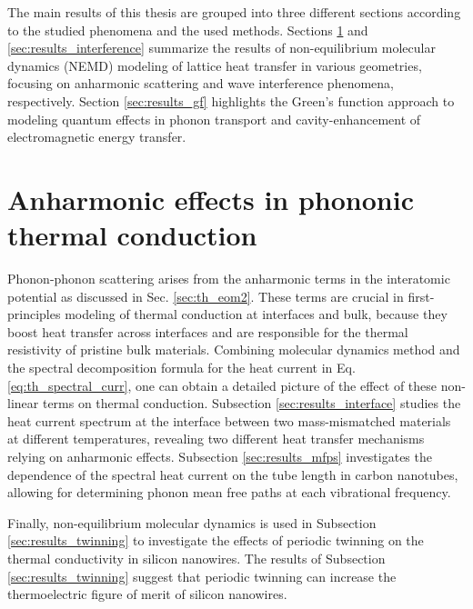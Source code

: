 
\label{chap:results}

The main results of this thesis are grouped into three different sections according to the studied phenomena and the used methods. Sections \ref{sec:results_anharm} and \ref{sec:results_interference} summarize the results of non-equilibrium molecular dynamics (NEMD) modeling of lattice heat transfer in various geometries, focusing on anharmonic scattering and wave interference phenomena, respectively. Section \ref{sec:results_gf} highlights the Green's function approach to modeling quantum effects in phonon transport and cavity-enhancement of electromagnetic energy transfer.


\section{Anharmonic effects in phononic thermal conduction}
\label{sec:results_anharm}

Phonon-phonon scattering arises from the anharmonic terms in the interatomic potential as discussed in Sec. \ref{sec:th_eom2}. These terms are crucial in first-principles modeling of thermal conduction at interfaces and bulk, because they boost heat transfer across interfaces \cite{lyeo06} and are responsible for the thermal resistivity of pristine bulk materials. Combining molecular dynamics method and the spectral decomposition formula for the heat current in Eq. \eqref{eq:th_spectral_curr}, one can obtain a detailed picture of the effect of these non-linear terms on thermal conduction. Subsection \ref{sec:results_interface} studies the heat current spectrum at the interface between two mass-mismatched materials at different temperatures, revealing two different heat transfer mechanisms relying on anharmonic effects. Subsection \ref{sec:results_mfps} investigates the dependence of the spectral heat current on the tube length in carbon nanotubes, allowing for determining phonon mean free paths at each vibrational frequency. 

Finally, non-equilibrium molecular dynamics is used in Subsection \ref{sec:results_twinning} to investigate the effects of periodic twinning on the thermal conductivity in silicon nanowires.  \cite{johansson06,xiong06,davidson07,algra08}  The results of Subsection \ref{sec:results_twinning} suggest that periodic twinning can increase the thermoelectric figure of merit of silicon nanowires. 

